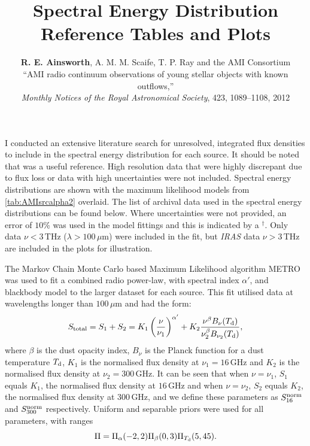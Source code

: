 \documentclass[9pt]{extarticle}   	%
\title{Spectral Energy Distribution Reference Tables and Plots}
\author{\textbf{R. E. Ainsworth}, A. M. M. Scaife, T. P. Ray and the AMI Consortium \\``AMI radio continuum observations of young stellar objects with known outflows,'' \\ \textit{Monthly Notices of the Royal Astronomical Society}, 423, 1089--1108, 2012}
\date{}							%
\begin{document}
\maketitle

I conducted an extensive literature search for unresolved, integrated flux densities to include in the spectral energy distribution for each source. It should be noted that \citet{1995A&AS..109..177W} was a useful reference. High resolution data that were highly discrepant due to flux loss or data with high uncertainties \citep[e.g. $450\,\mu$m data from][]{2008ApJS..175..277D} were not included. Spectral energy distributions are shown with the maximum likelihood models from \ref{tab:AMIsrcalpha2} overlaid. The list of archival data used in the spectral energy distributions can be found below. Where uncertainties were not provided, an error of $10$\% was used in the model fittings and this is indicated by a $^{\dag}$. Only data $\nu<3$\,THz ($\lambda>100\,\mu$m) were included in the fit, but \textit{IRAS} data $\nu>3$\,THz are included in the plots for illustration.

The Markov Chain Monte Carlo based Maximum Likelihood algorithm \textsc{METRO} \citep{hob04} was used to fit a combined radio power-law, with spectral index $\alpha'$, and blackbody model to the larger dataset for each source. This fit utilised data at wavelengths longer than $100\,\mu$m and had the form: 
\begin{equation}
S_{\rm total} = S_{1} + S_{2} = K_{1}\left(\frac{\nu}{\nu_{1}}\right)^{\alpha'} + K_{2}\frac{\nu^{\beta}B_{\nu}(T_{\rm{d}})}{\nu_{2}^{\beta}B_{\nu_{2}}(T_{\rm{d}})},
\end{equation}
where $\beta$ is the dust opacity index, $B_{\nu}$ is the Planck function for a dust temperature $T_{\rm{d}}$, $K_{1}$ is the normalised flux density at $\nu_{1}=16$\,GHz and $K_{2}$ is the normalised flux density at $\nu_{2}=300$\,GHz. It can be seen that when $\nu=\nu_{1}$, $S_{1}$ equals $K_{1}$, the normalised flux density at $16$\,GHz and when $\nu=\nu_{2}$, $S_{2}$ equals $K_{2}$, the normalised flux density at $300$\,GHz, and we define these parameters as $S_{16}^{\rm norm}$ and $S_{300}^{\rm norm}$ respectively. Uniform and separable priors were used for all parameters, with ranges
\begin{equation}
\Pi=\Pi_{\alpha}(-2,2)\Pi_{\beta}(0,3)\Pi_{T_{\rm d}}(5,45).
\end{equation}
\end{document}

